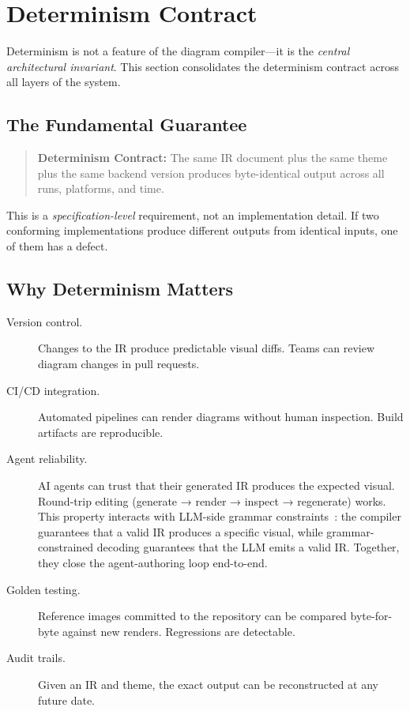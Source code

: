 \section{Determinism Contract}
\label{sec:determinism}

Determinism is not a feature of the diagram compiler---it is the \emph{central architectural invariant}. This section consolidates the determinism contract across all layers of the system.

\subsection{The Fundamental Guarantee}

\begin{quote}
\textbf{Determinism Contract:} The same IR document plus the same theme plus the same backend version produces byte-identical output across all runs, platforms, and time.
\end{quote}

This is a \emph{specification-level} requirement, not an implementation detail. If two conforming implementations produce different outputs from identical inputs, one of them has a defect.

\subsection{Why Determinism Matters}

\begin{description}
  \item[Version control.] Changes to the IR produce predictable visual diffs. Teams can review diagram changes in pull requests.
  
  \item[CI/CD integration.] Automated pipelines can render diagrams without human inspection. Build artifacts are reproducible.
  
  \item[Agent reliability.] AI agents can trust that their generated IR produces the expected visual. Round-trip editing (generate → render → inspect → regenerate) works. This property interacts with LLM-side grammar constraints~\cite{willard2023}: the compiler guarantees that a valid IR produces a specific visual, while grammar-constrained decoding guarantees that the LLM emits a valid IR. Together, they close the agent-authoring loop end-to-end.
  
  \item[Golden testing.] Reference images committed to the repository can be compared byte-for-byte against new renders. Regressions are detectable.
  
  \item[Audit trails.] Given an IR and theme, the exact output can be reconstructed at any future date.
\end{description}

